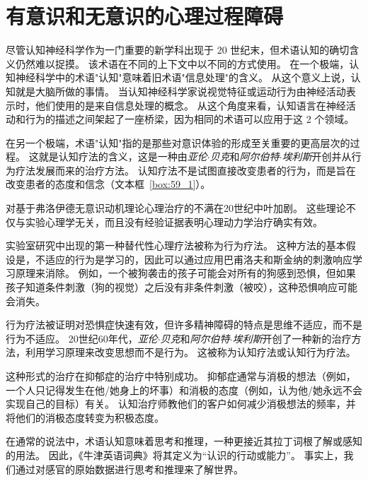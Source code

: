 \chapter{有意识和无意识的心理过程障碍} \label{chap:chap59}

尽管认知神经科学作为一门重要的新学科出现于 20 世纪末，但术语认知的确切含义仍然难以捉摸。
该术语在不同的上下文中以不同的方式使用。
在一个极端，认知神经科学中的术语"认知"意味着旧术语"信息处理"的含义。
从这个意义上说，认知就是大脑所做的事情。
当认知神经科学家说视觉特征或运动行为由神经活动表示时，他们使用的是来自信息处理的概念。
从这个角度来看，认知语言在神经活动和行为的描述之间架起了一座桥梁，因为相同的术语可以应用于这 2 个领域。


在另一个极端，术语"认知"指的是那些对意识体验的形成至关重要的更高层次的过程。
这就是认知疗法的含义，这是一种由\textit{亚伦$\cdot$贝克}和\textit{阿尔伯特$\cdot$埃利斯}开创并从行为疗法发展而来的治疗方法。
认知疗法不是试图直接改变患者的行为，而是旨在改变患者的态度和信念（文本框~\ref{box:59_1}）。



\begin{proposition}[认知疗法] \label{box:59_1}
	
	\quad \quad 对基于弗洛伊德无意识动机理论心理治疗的不满在20世纪中叶加剧。
	这些理论不仅与实验心理学无关，而且没有经验证据表明心理动力学治疗确实有效。
	
	\quad \quad 实验室研究中出现的第一种替代性心理疗法被称为行为疗法。
	这种方法的基本假设是，不适应的行为是学习的，因此可以通过应用巴甫洛夫和斯金纳的刺激响应学习原理来消除。
	例如，一个被狗袭击的孩子可能会对所有的狗感到恐惧，但如果孩子知道条件刺激（狗的视觉）之后没有非条件刺激（被咬），这种恐惧响应可能会消失。
	
	\quad \quad 行为疗法被证明对恐惧症快速有效，但许多精神障碍的特点是思维不适应，而不是行为不适应。
	20世纪60年代，\textit{亚伦$\cdot$贝克}和\textit{阿尔伯特$\cdot$埃利斯}开创了一种新的治疗方法，利用学习原理来改变思想而不是行为。
	这被称为认知疗法或认知行为疗法。
	
	\quad \quad 这种形式的治疗在抑郁症的治疗中特别成功。
	抑郁症通常与消极的想法（例如，一个人只记得发生在他/她身上的坏事）和消极的态度（例如，认为他/她永远不会实现自己的目标）有关。
	认知治疗师教他们的客户如何减少消极想法的频率，并将他们的消极态度转变为积极态度。
	
\end{proposition}



在通常的说法中，术语认知意味着思考和推理，一种更接近其拉丁词根了解或感知的用法。
因此，《牛津英语词典》将其定义为“认识的行动或能力”。
事实上，我们通过对感官的原始数据进行思考和推理来了解世界。


